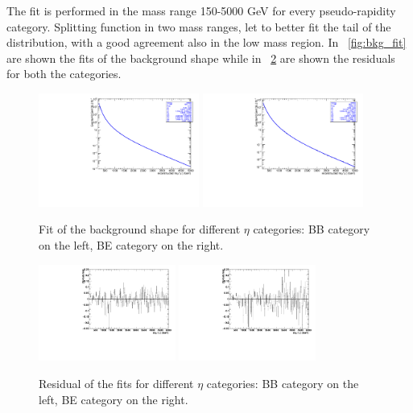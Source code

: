 The fit is performed in the mass range 150-5000 GeV for every
pseudo-rapidity category.
Splitting function in two mass ranges, let to better fit the tail of the distribution,
with a good agreement also in the low mass region.
In \figurename~\ref{fig:bkg_fit} are shown the fits of the background shape while
in \figurename~\ref{fig:bkg_res} are shown the residuals for both the categories.
\begin{figure}[htbp]
\centering
\includegraphics[width=0.47\textwidth]{Images/Cap5/mass150_5000_log_BB_9par.pdf}
\includegraphics[width=0.47\textwidth]{Images/Cap5/mass150_5000_log_BE_9par.pdf}
\caption{\label{bkg_fit} Fit of the background shape for different $\eta$ categories: BB category on the left, BE category  on the right.}
\end{figure}

\begin{figure}[htbp]
\centering
\includegraphics[width=0.4\textwidth]{Images/Cap5/res_150_5000_BB_9par.pdf}
\includegraphics[width=0.4\textwidth]{Images/Cap5/res_150_5000_BE_9par.pdf}
\caption{\label{fig:bkg_res} Residual of the fits for different $\eta$ categories: BB category on the left, BE category on the right.}
\end{figure}

